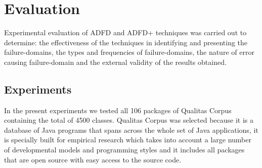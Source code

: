 \documentclass[runningheads,a4paper]{llncs}
\begin{document}
\begin{enumerate}
%
%


\end{enumerate}




\section{Evaluation}
Experimental evaluation of ADFD and ADFD+ techniques was carried out to determine: the effectiveness of the techniques in identifying and presenting the failure-domains, the types and frequencies of failure-domains, the nature of error causing failure-domain and the external validity of the results obtained. 


\subsection{Experiments}
In the present experiments we tested all 106 packages of Qualitas Corpus containing the total of 4500 classes. Qualitas Corpus was selected because it is a database of Java programs that spans across the whole set of Java applications, it is specially built for empirical research which takes into account a large number of developmental models and programming styles and it includes all packages that are open source with easy access to the source code.
\end{document}

